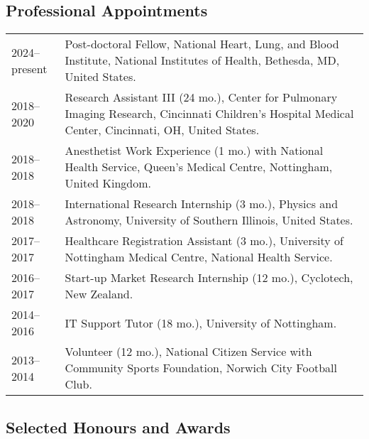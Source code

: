\documentclass[12pt,]{scrartcl}
\begin{document}
\subsection{Professional Appointments}\label{appointments}

\begin{table}[h!]
{\def\arraystretch{1.5}\tabcolsep=0pt
\begin{tabular}{p{0.15\linewidth}p{0.85\linewidth}}

  2024--present & Post-doctoral Fellow, National Heart, Lung, and Blood Institute, National Institutes of Health, Bethesda, MD, United States. \\
  
  2018--2020 & Research Assistant III (24 mo.), Center for Pulmonary Imaging Research, Cincinnati Children's Hospital Medical Center, Cincinnati, OH, United States. \\
  
  2018--2018 & Anesthetist Work Experience (1 mo.) with National Health Service, Queen's Medical Centre, Nottingham, United Kingdom. \\
  
  2018--2018 & International Research Internship (3 mo.), Physics and Astronomy, University of Southern Illinois, United States. \\
  
  2017--2017 & Healthcare Registration Assistant (3 mo.), University of Nottingham Medical Centre, National Health Service.  \\
  
  2016--2017 & Start-up Market Research Internship (12 mo.), Cyclotech, New Zealand.  \\

  2014--2016 & IT Support Tutor (18 mo.), University of Nottingham. \\
  
  2013--2014 & Volunteer (12 mo.), National Citizen Service with Community Sports Foundation,  Norwich City Football Club. 
\end{tabular}%
}
\end{table}

\newpage

\subsection{Selected Honours and
Awards}\label{selected-honours-and-awards}
\end{document}
